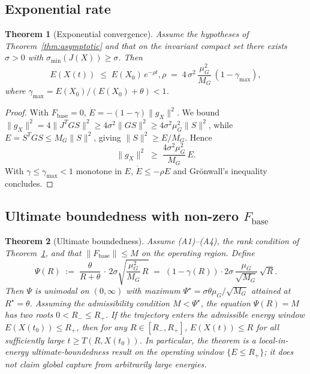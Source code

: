\documentclass[11pt,oneside]{amsart}
\def\qquad{ }%
\theoremstyle{plain}
\newtheorem{theorem}{Theorem}[section]
\theoremstyle{definition}
\newcommand{\gX}{g_X}
\newcommand{\Fbase}{F_{\mathrm{base}}}
\begin{document}
\subsection{Exponential rate}

\begin{theorem}[Exponential convergence]
\label{thm:exp}
Assume the hypotheses of Theorem~\ref{thm:asymptotic} and that on the
invariant compact set there exists $\sigma>0$ with
$\sigma_{\min}(J(X))\ge\sigma$. Then
\[
  E(X(t)) \;\le\; E(X_{0})\,e^{-\rho t},
  \qquad
  \rho \;=\; 4\,\sigma^{2}\,\frac{\mu_{G}^{2}}{M_{G}}\,(1-\gamma_{\max}),
\]
where $\gamma_{\max} = E(X_{0})/(E(X_{0})+\theta)<1$.
\end{theorem}

\begin{proof}
With $\Fbase = 0$, $\dot{E} = -(1-\gamma)\|\gX\|^{2}$. We bound
$\|\gX\|^{2} = 4\|J^{T}GS\|^{2}\ge 4\sigma^{2}\|GS\|^{2}
\ge 4\sigma^{2}\mu_{G}^{2}\|S\|^{2}$, while
$E = S^{T}GS\le M_{G}\|S\|^{2}$, giving $\|S\|^{2}\ge E/M_{G}$. Hence
\[
  \|\gX\|^{2}\;\ge\; \frac{4\sigma^{2}\mu_{G}^{2}}{M_{G}}\,E.
\]
With $\gamma\le\gamma_{\max}<1$ monotone in $E$, $\dot E\le -\rho E$ and
Gr\"onwall's inequality concludes.
\end{proof}

\subsection{Ultimate boundedness with non-zero \texorpdfstring{$\Fbase$}{Fbase}}

\begin{theorem}[Ultimate boundedness]
\label{thm:ub}
Assume \textup{(A1)--(A4)}, the rank condition of Theorem~\ref{thm:exp},
and that $\|\Fbase\|\le M$ on the operating region. Define
\[
  \Psi(R) \;:=\; \frac{\theta}{R+\theta}\,\cdot\,
                 2\sigma\sqrt{\frac{\mu_{G}^{2}}{M_{G}}\,R}
             \;=\; (1-\gamma(R))\cdot 2\sigma\,\frac{\mu_{G}}{\sqrt{M_{G}}}\,\sqrt{R}.
\]
Then $\Psi$ is unimodal on $(0,\infty)$ with maximum
$\Psi^{\star} = \sigma\theta\mu_{G}/\sqrt{M_{G}}$ attained at $R^{\star}=\theta$.
Assuming the \emph{admissibility condition} $M < \Psi^{\star}$, the
equation $\Psi(R) = M$ has two roots $0<R_{-}\le R_{+}$. If the
trajectory enters the admissible energy window $E(X(t_{0}))\le R_{+}$,
then for any $R\in[R_{-},R_{+}]$,
\(
  E(X(t))\le R
\)
for all sufficiently large $t\ge T(R,X(t_{0}))$. In particular, the
theorem is a \emph{local-in-energy} ultimate-boundedness result on the
operating window $\{E\le R_{+}\}$; it does not claim global capture
from arbitrarily large energies.
\end{theorem}
\end{document}
